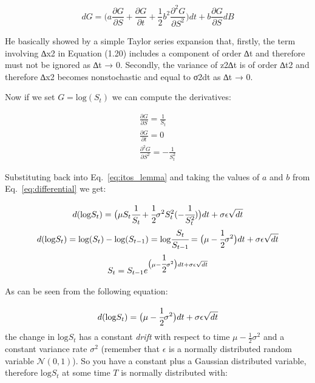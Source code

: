 \begin{equation}
dG=\big(a\frac{\partial G}{\partial S} + \frac{\partial G}{\partial t} + \frac{1}{2}b^2\frac{\partial^2 G}{\partial S^2} \big)dt + b \frac{\partial G}{\partial S}dB
\label{eq:itos_lemma}
\end{equation}

He basically showed by a simple Taylor series expansion that, firstly, 
the term involving ∆x2 in Equation (1.20) includes a component of order ∆t and
therefore must not be ignored as ∆t → 0. Secondly, the variance of z2∆t
is of order ∆t2 and therefore ∆x2 becomes nonstochastic and equal to
σ2dt as ∆t → 0. 

Now if we set \(G = \textrm{log}(S_t)\) we can compute the derivatives:

\begin{equation}
\begin{gathered}
\frac{\partial G}{\partial S} = \frac{1}{S_t}\\
\frac{\partial G}{\partial t} = 0\\
\frac{\partial^2 G}{\partial S^2} = -\frac{1}{S_t^{2}}
\end{gathered}
\end{equation}

Substituting back into Eq.~\ref{eq:itos_lemma} and taking the values of $a$ and $b$ from Eq.~\ref{eq:differential} we get:

\begin{equation}
\begin{gathered}
d(\textrm{log} S_t) = \big(\mu S_t \cfrac{1}{S_t} + \cfrac{1}{2}\sigma^2 S_t^2 (-\cfrac{1}{S_t^2})\big)dt + \sigma\epsilon\sqrt{dt}\\
d(\textrm{log} S_t) = \textrm{log} (S_t) - \textrm{log} (S_{t-1}) = \textrm{log} \cfrac{S_t}{S_{t-1}} = \big(\mu - \cfrac{1}{2}\sigma^2\big)dt + \sigma\epsilon\sqrt{dt}\\
S_t = S_{t-1}e^{\big(\mu - \cfrac{1}{2}\sigma^2\big)dt + \sigma\epsilon\sqrt{dt}}
\end{gathered}
\end{equation}

As can be seen from the following equation:

\begin{equation}
d(\textrm{log} S_t) = \big(\mu - \cfrac{1}{2}\sigma^2\big)dt + \sigma\epsilon\sqrt{dt}
\end{equation}
the change in \(\textrm{log} S_t\) has a constant \emph{drift} with respect to time \(\mu - \frac{1}{2}\sigma^2\) and a constant variance rate \(\sigma^2\)
(remember that \(\epsilon\) is a normally distributed random variable
\(\mathcal{N}(0,1)\)). So you have a constant plus a Gaussian
distributed variable, therefore \(\textrm{log} S_t\) at some time \(T\)
is normally distributed with:

